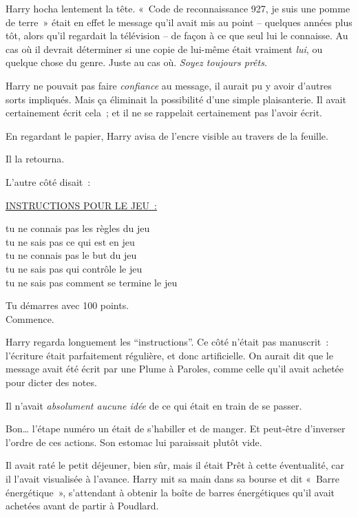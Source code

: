 Harry hocha lentement la tête. «~Code de reconnaissance 927, je suis une pomme de terre~» était en effet le message qu'il avait mis au point -- quelques années plus tôt, alors qu'il regardait la télévision -- de façon à ce que seul lui le connaisse. Au cas où il devrait déterminer si une copie de lui-même était vraiment \emph{lui}, ou quelque chose du genre. Juste au cas où. \emph{Soyez toujours prêts}.

Harry ne pouvait pas faire \emph{confiance} au message, il aurait pu y avoir d'autres sorts impliqués. Mais ça éliminait la possibilité d'une simple plaisanterie. Il avait certainement écrit cela~; et il ne se rappelait certainement pas l'avoir écrit.

En regardant le papier, Harry avisa de l'encre visible au travers de la feuille.

Il la retourna.

L'autre côté disait~:

\begin{writtenNote}\centering
\textsc{\underline{INSTRUCTIONS POUR LE JEU~:}}

tu ne connais pas les règles du jeu\\
tu ne sais pas ce qui est en jeu\\
tu ne connais pas le but du jeu\\
tu ne sais pas qui contrôle le jeu\\
tu ne sais pas comment se termine le jeu


Tu démarres avec 100 points.\\
Commence.
\end{writtenNote}

Harry regarda longuement les “instructions”. Ce côté n'était pas manuscrit~: l'écriture était parfaitement régulière, et donc artificielle. On aurait dit que le message avait été écrit par une Plume à Paroles, comme celle qu'il avait achetée pour dicter des notes.

Il n'avait \emph{absolument aucune idée} de ce qui était en train de se passer.

Bon… l'étape numéro un était de s'habiller et de manger. Et peut-être d'inverser l'ordre de ces actions. Son estomac lui paraissait plutôt vide.

Il avait raté le petit déjeuner, bien sûr, mais il était Prêt à cette éventualité, car il l'avait visualisée à l'avance. Harry mit sa main dans sa bourse et dit «~Barre énergétique~», s'attendant à obtenir la boîte de barres énergétiques qu'il avait achetées avant de partir à Poudlard.

